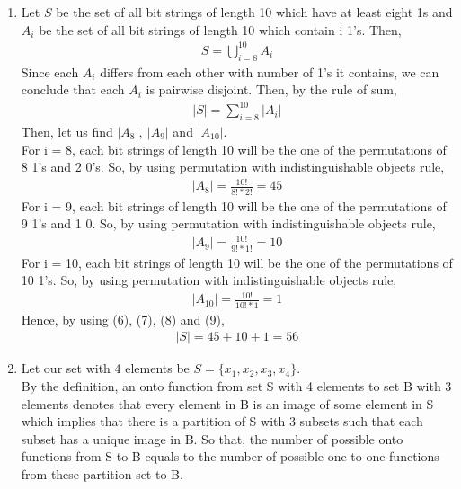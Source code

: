 \documentclass[12pt]{article}
\begin{document}
\begin{enumerate}
\item Let $S$ be the set of all bit strings of length 10 which have at least eight 1s and $A_{i}$ be the set of all bit strings of length 10 which contain i 1's. Then,
\begin{equation*}
\begin{split}
S = \bigcup\nolimits_{i = 8}^{10} A_{i}
\end{split}
\end{equation*}
Since each $A_{i}$ differs from each other with number of 1's it contains, we can conclude that each $A_{i}$ is pairwise disjoint. Then, by the rule of sum,
\begin{equation}
\begin{split}
|S| = \sum_{i=8}^{10} |A_{i}|
\end{split}
\end{equation}
Then, let us find $|A_{8}|,\ |A_{9}|$ and $|A_{10}|$. \\
For i = 8, each bit strings of length 10 will be the one of the permutations of 8 1's and 2 0's. So, by using permutation with indistinguishable objects rule,
\begin{equation}
\begin{split}
|A_{8}| = \frac{10!}{8!*2!} = 45
\end{split}
\end{equation}
For i = 9, each bit strings of length 10 will be the one of the permutations of 9 1's and 1 0. So, by using permutation with indistinguishable objects rule,
\begin{equation}
\begin{split}
|A_{9}| = \frac{10!}{9!*1!} = 10
\end{split}
\end{equation}
For i = 10, each bit strings of length 10 will be the one of the permutations of 10 1's. So, by using permutation with indistinguishable objects rule,
\begin{equation}
\begin{split}
|A_{10}| = \frac{10!}{10!*1} = 1
\end{split}
\end{equation}
Hence, by using (6), (7), (8) and (9),
\begin{equation}
\begin{split}
|S| = 45 + 10 + 1 = 56
\end{split}
\end{equation}


\item Let our set with 4 elements be $S = \{x_{1},x_{2},x_{3},x_{4}\}$.\\
 By the definition, an onto function from set S with 4 elements to set B with 3 elements denotes that every element in B is an image of some element in S which implies that there is a partition of S with 3 subsets such that each subset has a unique image in B. So that, the number of possible onto functions from S to B equals to the number of possible one to one functions from these partition set to B.
 

\end{enumerate}
\end{document}
